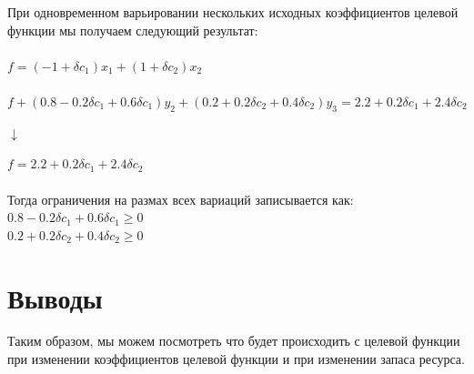 \documentclass[14pt,a4paper,fleqn]{extarticle}
\begin{document}
При одновременном варьировании нескольких исходных коэффициентов целевой функции мы получаем следующий результат:\\\\
$f = (-1 + \delta c_1)x_1 + (1 + \delta c_2)x_2$\\\\
\small $f + (0.8 - 0.2\delta c_1 + 0.6\delta c_1)y_2 + (0.2 + 0.2\delta c_2 + 0.4\delta c_2)y_3 = 2.2 + 0.2\delta c_1 + 2.4\delta c_2$
\begin{center}
	$\downarrow$
\end{center}
\normalsize$f = 2.2 + 0.2\delta c_1 + 2.4\delta c_2$\\\\
Тогда ограничения на размах всех вариаций записывается как:\\
$0.8 - 0.2\delta c_1 + 0.6\delta c_1 \geq 0$\\
$0.2 + 0.2\delta c_2 + 0.4\delta c_2 \geq 0$
\section*{Выводы}
Таким образом, мы можем посмотреть что будет происходить с целевой функции при изменении коэффициентов целевой функции и при изменении запаса ресурса.
\end{document}
